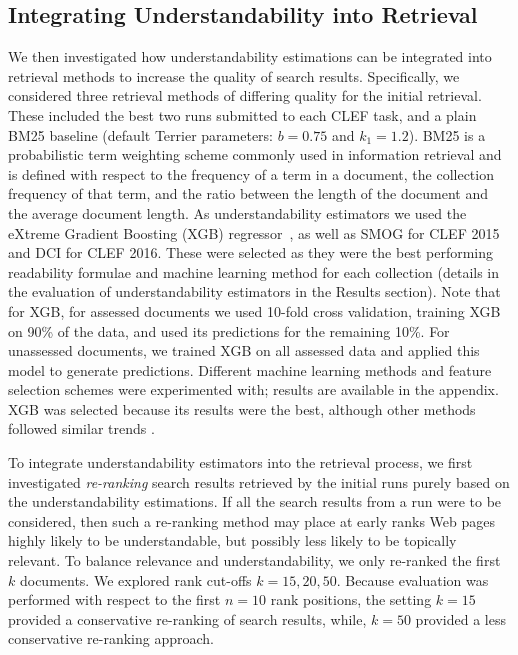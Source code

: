 \documentclass[10pt,a4paper]{article}
\begin{document}
\subsection*{Integrating Understandability into Retrieval}
\label{sec:method_ltr}

We then investigated how understandability estimations can be integrated into retrieval methods to increase the quality of search results.
Specifically, we considered three retrieval methods of differing quality for the initial retrieval. These included the best two runs submitted to each CLEF task, and a plain BM25 baseline (default Terrier parameters: $b=0.75$ and $k_1=1.2$). BM25 is a probabilistic term weighting scheme commonly used in information retrieval and is defined with respect to the frequency of a term in a document, the collection frequency of that term, and the ratio between the length of the document and the average document length. As understandability estimators we used the eXtreme Gradient Boosting (XGB) regressor~\cite{chen16}, as well as SMOG for CLEF 2015 and DCI for CLEF 2016. 
These were selected as they were the best performing readability formulae and machine learning method for each collection (details in the evaluation of understandability estimators in the Results section).
Note that for XGB, for assessed documents we used 10-fold cross validation, training XGB on 90\% of the data, and used its predictions for the remaining 10\%. For unassessed documents, we trained XGB on all assessed data and applied this model to generate predictions. Different machine learning methods and feature selection schemes were experimented with; results are available in the appendix. XGB was selected because its results were the best, although other methods followed similar trends .


To integrate understandability estimators into the retrieval process, we first investigated \textit{re-ranking} search results retrieved by the initial runs purely based on the understandability estimations. 
If all the search results from a run were to be considered, then such a re-ranking method may place at early ranks Web pages highly likely to be understandable, but possibly less likely to be topically relevant. To balance relevance and understandability, we only re-ranked the first $k$ documents. We explored rank cut-offs $k = 15, 20, 50$. Because evaluation was performed with respect to the first $n=10$ rank positions, the setting $k=15$ provided a conservative re-ranking of search results, while, $k=50$ provided a less conservative re-ranking approach.
\end{document}
